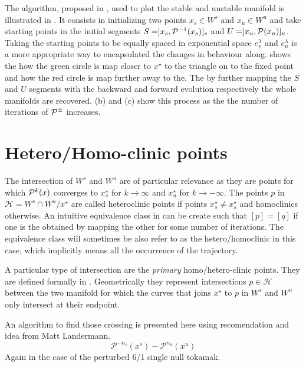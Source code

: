The algorithm, proposed in \cite{wei_invariant_2023}, used to plot the stable and unstable manifold is illustrated in . It consists in initializing two points $x_s \in W^s$ and $x_u \in W^u$ and take starting points in the initial segments $S = ]x_s,\mathcal{P}^{-1}(x_s)]_s$ and $U = ]x_u,\mathcal{P}(x_u)]_u$. Taking the starting points to be equally spaced in exponential space $e^\lambda_s$ and $e^\lambda_u$ is a more appropriate way to encapsulated the changes in behaviour along.  shows the how the green circle is map closer to $x^\star$ to the triangle on to the fixed point and how the red circle is map further away to the. The by further mapping the $S$ and $U$ segments with the backward and forward evolution respectively the whole manifolds are recovered.  (b) and (c) show this process as the the number of iterations of $\mathcal{P}^\pm$ increases.

\section{Hetero/Homo-clinic points}

The intersection of $W^s$ and $W^u$ are of particular relevance as they are points for which $\mathcal{P}^k(x)$ converges to $x_s^\star$ for $k \to \infty$ and $x_u^\star$ for $k \to -\infty$. The points $p$ in $\mathcal{H} = W^s \cap W^u / {x^\star}$ are called heteroclinic points if points $x_s^\star \neq x_s^\star$ and homoclinics otherwise. An intuitive equivalence class in can be create such that $[p] = [q]$ if one is the obtained by mapping the other for some number of iterations. The equivalence class will sometimes be also refer to as the hetero/homoclinic in this case, which implicitly means all the occurrence of the trajectory.

A particular type of intersection are the \textit{primary} homo/hetero-clinic points. 
They are defined formally in \cite[p.14]{hohloch_homoclinic_2017}. Geometrically they represent intersections $p\in\mathcal{H}$ between the two manifold for which the curves that joins $x^\star$ to $p$ in $W^s$ and $W^u$ only intersect at their endpoint.

An algorithm to find those crossing is presented here using recomendation and idea from Matt Landermann. 
\begin{equation*}
    \mathcal{P}^{-n_s}(x^s) - \mathcal{P}^{n_u}(x^u)
\end{equation*}
Again in the case of the perturbed 6/1 single null tokamak. 


